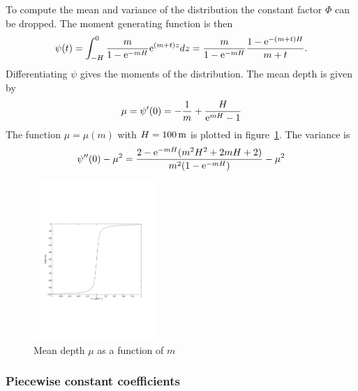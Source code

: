 To compute the mean and variance of the distribution the constant
factor $\Phi$ can be dropped. The moment generating function is then
\begin{equation}\label{eq:momgen}
  \psi(t) = \int_{-H}^0 \frac{m}{1 - \mathrm{e}^{-mH}} \mathrm{e}^{(m+t)z} dz
          = \frac{m}{1 - \mathrm{e}^{-mH}} \frac{1 - \mathrm{e}^{-(m+t)H}}{m+t}.
\end{equation}
Differentiating $\psi$ gives the moments of the distribution.
The mean depth is given by
\begin{equation}\label{eq:eggsactmean}
  \mu = \psi'(0) = - \frac{1}{m} + \frac{H}{\mathrm{e}^{mH} - 1}
\end{equation}
The function $\mu = \mu(m)$ with $H = 100\, \mbox{m}$ is plotted in
figure~\ref{fig:mdepth}.  The variance is
\begin{equation}\label{eq:eggsactvar}
       \psi''(0) - \mu^2
      = \frac{2 - \mathrm{e}^{-mH}(m^2 H^2 + 2 m H + 2)}{m^2 ( 1 - \mathrm{e}^{-mH})} - \mu^2
\end{equation}


\begin{figure}
\begin{center}
\includegraphics[height=6cm]{mdepth}
\end{center}
\caption{Mean depth $\mu$ as a function of $m$}\label{fig:mdepth}
\end{figure}

\subsubsection{Piecewise constant coefficients}

